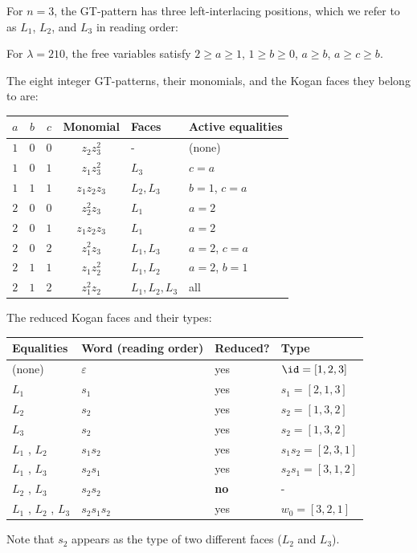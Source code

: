 \begin{example*}[Worked example: $n = 3$, $\lambda=210$]
For $n = 3$, the GT-pattern has three left-interlacing positions, which we refer to as $L_1$, $L_2$, and $L_3$ in reading order:
\begin{figure}
\end{figure}

For $\lambda = 210$, the free variables satisfy $2 \geq a \geq 1$, $1 \geq b \geq 0$,
$a \geq b$, $a \geq c \geq b$.

The eight integer GT-patterns, their monomials,
and the Kogan faces they belong to are:

\begin{center}
\begin{tabular}{ccccll}
\toprule
$a$ & $b$ & $c$ & Monomial & Faces & Active equalities \\
\midrule
$1$ & $0$ & $0$ & $z_2 z_3^2$ & - & (none) \\
$1$ & $0$ & $1$ & $z_1 z_3^2$ & $L_3$ & $c = a$ \\
$1$ & $1$ & $1$ & $z_1 z_2 z_3$ & $L_2, L_3$ & $b = 1$, $c = a$ \\
$2$ & $0$ & $0$ & $z_2^2 z_3$ & $L_1$ & $a = 2$ \\
$2$ & $0$ & $1$ & $z_1 z_2 z_3$ & $L_1$ & $a = 2$ \\
$2$ & $0$ & $2$ & $z_1^2 z_3$ & $L_1, L_3$ & $a = 2$, $c = a$ \\
$2$ & $1$ & $1$ & $z_1 z_2^2$ & $L_1, L_2$ & $a = 2$, $b = 1$ \\
$2$ & $1$ & $2$ & $z_1^2 z_2$ & $L_1, L_2, L_3$ & all \\
\bottomrule
\end{tabular}
\end{center}

The reduced Kogan faces and their types:
\begin{center}
\begin{tabular}{llll}
\toprule
Equalities & Word (reading order) & Reduced? & Type \\
\midrule
(none) & $\varepsilon$ & yes & $\id = [1,2,3]$ \\
$L_1$ & $s_1$ & yes & $s_1 = [2,1,3]$ \\
$L_2$ & $s_2$ & yes & $s_2 = [1,3,2]$ \\
$L_3$ & $s_2$ & yes & $s_2 = [1,3,2]$ \\
$L_1$ , $L_2$ & $s_1 s_2$ & yes & $s_1 s_2 = [2,3,1]$ \\
$L_1$ , $L_3$ & $s_2 s_1$ & yes & $s_2 s_1 = [3,1,2]$ \\
$L_2$ , $L_3$ & $s_2 s_2$ & \textbf{no} & - \\
$L_1$ , $L_2$ , $L_3$ & $s_2 s_1 s_2$ & yes & $w_0 = [3,2,1]$ \\
\bottomrule
\end{tabular}
\end{center}
Note that $s_2$ appears as the type of two different faces ($L_2$ and $L_3$).
\end{example*}


